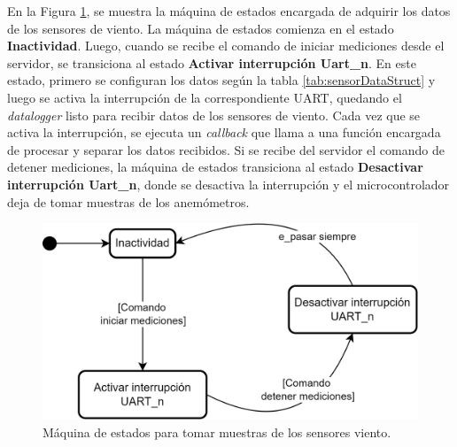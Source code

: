 En la Figura \ref{fig:sc_sampleSensorWind}, se muestra la máquina de estados encargada de adquirir los datos de los sensores de viento. La máquina de estados comienza en el estado \textbf{Inactividad}. Luego, cuando se recibe el comando de iniciar mediciones desde el servidor, se transiciona al estado \textbf{Activar interrupción Uart\_n}. En este estado, primero se configuran los datos según la tabla \ref{tab:sensorDataStruct} y luego se activa la interrupción de la correspondiente UART, quedando el \textit{datalogger} listo para recibir datos de los sensores de viento. Cada vez que se activa la interrupción, se ejecuta un \textit{callback} que llama a una función encargada de procesar y separar los datos recibidos. Si se recibe del servidor el comando de detener mediciones, la máquina de estados transiciona al estado \textbf{Desactivar interrupción Uart\_n}, donde se desactiva la interrupción y el microcontrolador deja de tomar muestras de los anemómetros.

\begin{figure}[H]
    \centering
    \includegraphics[width=0.7\linewidth]{Figuras/datalogger/Firmware/sc_sampleSensorWind.png}
    \caption{Máquina de estados para tomar muestras de los sensores viento.}
    \label{fig:sc_sampleSensorWind}
\end{figure}

